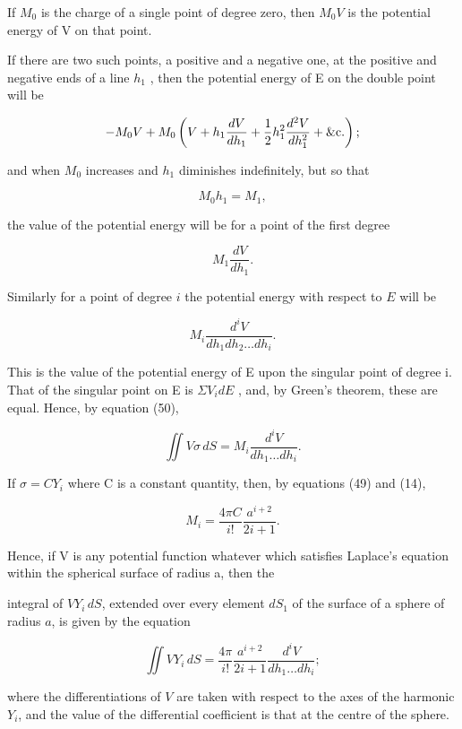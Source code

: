 \documentclass[11pt,a4paper]{article}
\begin{document}
If  $M_0$  is the charge of a single point of degree zero, then  $M_0V$  is the potential energy of V on that point.

If there are two such points, a positive and a negative one, at the positive and negative ends of a line  $h_1$ , then the potential energy of E on the double point will be

\[
-M_0V+M_0\left(V+h_1\frac{dV}{dh_1}+\frac{1}{2}h_1^2\frac{d^2V}{dh_1^2}+\hbox{\&c.}\right);
\]

and when  $M_0$  increases and  $h_1$  diminishes indefinitely, but so that

\[
M_0 h_1 = M_1,
\]

the value of the potential energy will be for a point of the first degree

\[
M_1 \frac{dV}{dh_1}.
\]

Similarly for a point of degree $i$ the potential energy with respect to $E$ will be

\[
M_i \frac{d^i V}{dh_1 dh_2 \dots dh_i}.
\]

This is the value of the potential energy of E upon the singular point of degree i. That of the singular point on E is  $\Sigma V_i dE$ , and, by Green's theorem, these are equal. Hence, by equation (50),

\[
\iint V\sigma \, dS = M_i \frac{d^i V}{dh_1 \dots dh_i}.
\]

If  $\sigma = CY_i$  where C is a constant quantity, then, by equations (49) and (14),

\begin{equation}\tag{51}
M_i=\frac{4\pi C}{i!}\frac{a^{i+2}}{2i+1}.
\end{equation}

Hence, if V is any potential function whatever which satisfies Laplace's equation within the spherical surface of radius a, then the

\setcounter{footnote}{0}
integral of $VY_i\,dS$, extended over every element $dS_1$ of the surface of a sphere of radius $a$, is given by the equation

\begin{equation}\tag{52}
\iint VY_i\,dS=\frac{4\pi}{i!}\frac{a^{i+2}}{2i+1}\frac{d^iV}{dh_1\ldots dh_i};
\end{equation}

where the differentiations of $V$ are taken with respect to the axes of the harmonic $Y_i$, and the value of the differential coefficient is that at the centre of the sphere.
\end{document}
